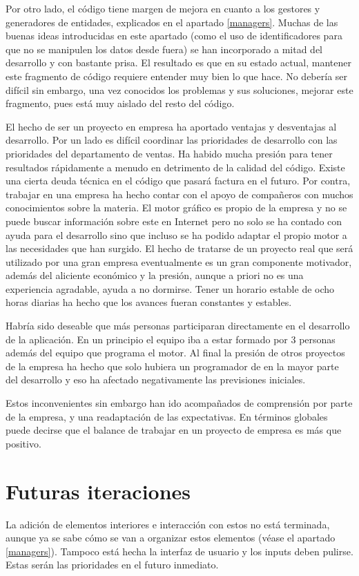 Por otro lado, el código tiene margen de mejora en cuanto a los gestores y generadores de entidades, explicados en el apartado \ref{managers}. Muchas de las buenas ideas introducidas en este apartado (como el uso de identificadores para que no se manipulen los datos desde fuera) se han incorporado a mitad del desarrollo y con bastante prisa. El resultado es que en su estado actual, mantener este fragmento de código requiere entender muy bien lo que hace. No debería ser difícil sin embargo, una vez conocidos los problemas y sus soluciones, mejorar este fragmento, pues está muy aislado del resto del código.

El hecho de ser un proyecto en empresa ha aportado ventajas y desventajas al desarrollo. Por un lado es difícil coordinar las prioridades de desarrollo con las prioridades del departamento de ventas. Ha habido mucha presión para tener resultados rápidamente a menudo en detrimento de la calidad del código. Existe una cierta deuda técnica en el código que pasará factura en el futuro. Por contra, trabajar en una empresa ha hecho contar con el apoyo de compañeros con muchos conocimientos sobre la materia. El motor gráfico es propio de la empresa y no se puede buscar información sobre este en Internet pero no solo se ha contado con ayuda para el desarrollo sino que incluso se ha podido adaptar el propio motor a las necesidades que han surgido. El hecho de tratarse de un proyecto real que será utilizado por una gran empresa eventualmente es un gran componente motivador, además del aliciente económico y la presión, aunque a priori no es una experiencia agradable, ayuda a no dormirse. Tener un horario estable de ocho horas diarias ha hecho que los avances fueran constantes y estables.

Habría sido deseable que más personas participaran directamente en el desarrollo de la aplicación. En un principio el equipo iba a estar formado por 3 personas además del equipo que programa el motor. Al final la presión de otros proyectos de la empresa ha hecho que solo hubiera un programador de en la mayor parte del desarrollo y eso ha afectado negativamente las previsiones iniciales.

Estos inconvenientes sin embargo han ido acompañados de comprensión por parte de la empresa, y una readaptación de las expectativas. En términos globales puede decirse que el balance de trabajar en un proyecto de empresa es más que positivo.

\section{Futuras iteraciones}
La adición de elementos interiores e interacción con estos no está terminada, aunque ya se sabe cómo se van a organizar estos elementos (véase el apartado \ref{managers}). Tampoco está hecha la interfaz de usuario y los inputs deben pulirse. Estas serán las prioridades en el futuro inmediato.


